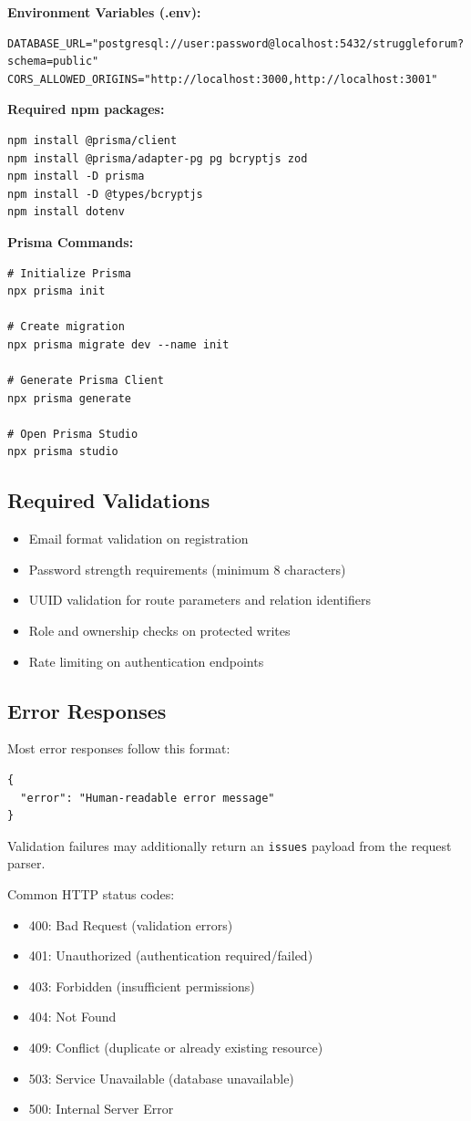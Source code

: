 \documentclass[11pt,a4paper]{article}
\begin{document}
\textbf{Environment Variables (.env):}
\begin{lstlisting}
DATABASE_URL="postgresql://user:password@localhost:5432/struggleforum?schema=public"
CORS_ALLOWED_ORIGINS="http://localhost:3000,http://localhost:3001"
\end{lstlisting}

\textbf{Required npm packages:}
\begin{lstlisting}
npm install @prisma/client
npm install @prisma/adapter-pg pg bcryptjs zod
npm install -D prisma
npm install -D @types/bcryptjs
npm install dotenv
\end{lstlisting}

\textbf{Prisma Commands:}
\begin{lstlisting}
# Initialize Prisma
npx prisma init

# Create migration
npx prisma migrate dev --name init

# Generate Prisma Client
npx prisma generate

# Open Prisma Studio
npx prisma studio
\end{lstlisting}

\subsection{Required Validations}
\begin{itemize}
    \item Email format validation on registration
    \item Password strength requirements (minimum 8 characters)
    \item UUID validation for route parameters and relation identifiers
    \item Role and ownership checks on protected writes
    \item Rate limiting on authentication endpoints
\end{itemize}

\subsection{Error Responses}
Most error responses follow this format:
\begin{lstlisting}
{
  "error": "Human-readable error message"
}
\end{lstlisting}

Validation failures may additionally return an \texttt{issues} payload from the request parser.

Common HTTP status codes:
\begin{itemize}
    \item 400: Bad Request (validation errors)
    \item 401: Unauthorized (authentication required/failed)
    \item 403: Forbidden (insufficient permissions)
    \item 404: Not Found
    \item 409: Conflict (duplicate or already existing resource)
    \item 503: Service Unavailable (database unavailable)
    \item 500: Internal Server Error
\end{itemize}
\end{document}
